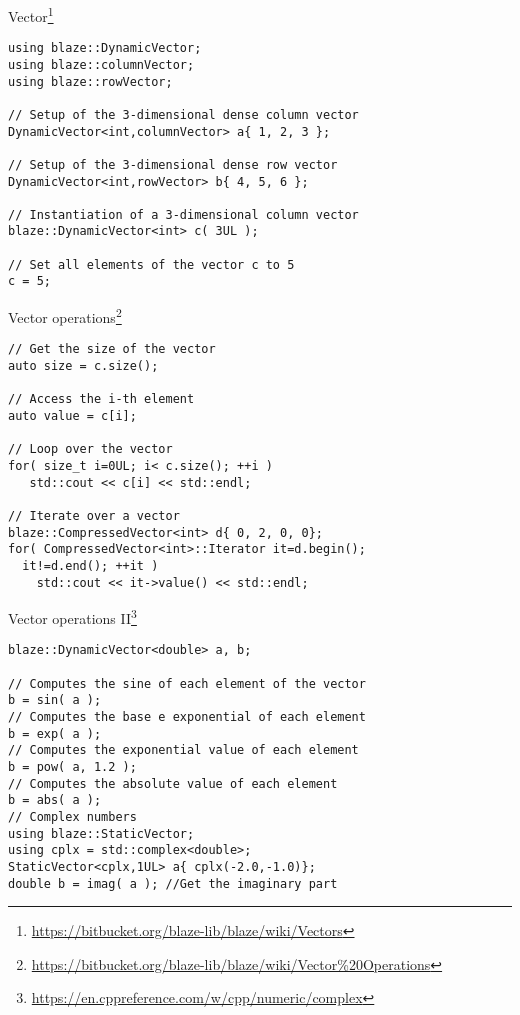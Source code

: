 \documentclass[\classoption]{beamer}
\begin{document}
\begin{frame}[fragile]{Vector\footnote{\tiny\url{https://bitbucket.org/blaze-lib/blaze/wiki/Vectors}}}
\begin{lstlisting}
using blaze::DynamicVector;
using blaze::columnVector;
using blaze::rowVector;

// Setup of the 3-dimensional dense column vector
DynamicVector<int,columnVector> a{ 1, 2, 3 };

// Setup of the 3-dimensional dense row vector
DynamicVector<int,rowVector> b{ 4, 5, 6 };

// Instantiation of a 3-dimensional column vector
blaze::DynamicVector<int> c( 3UL );

// Set all elements of the vector c to 5
c = 5;
\end{lstlisting}
\end{frame}

\begin{frame}[fragile]{Vector operations\footnote{\tiny\url{https://bitbucket.org/blaze-lib/blaze/wiki/Vector\%20Operations}}}
\begin{lstlisting}
// Get the size of the vector
auto size = c.size();

// Access the i-th element
auto value = c[i];

// Loop over the vector
for( size_t i=0UL; i< c.size(); ++i )
   std::cout << c[i] << std::endl;
   
// Iterate over a vector
blaze::CompressedVector<int> d{ 0, 2, 0, 0};
for( CompressedVector<int>::Iterator it=d.begin(); 
  it!=d.end(); ++it ) 
    std::cout << it->value() << std::endl;

\end{lstlisting}
\end{frame}

\begin{frame}[fragile]{Vector operations II\footnote{\tiny\url{https://en.cppreference.com/w/cpp/numeric/complex}}}
\begin{lstlisting}
blaze::DynamicVector<double> a, b;

// Computes the sine of each element of the vector
b = sin( a );  
// Computes the base e exponential of each element
b = exp( a ); 
// Computes the exponential value of each element
b = pow( a, 1.2 );   
// Computes the absolute value of each element
b = abs( a ); 
// Complex numbers
using blaze::StaticVector;
using cplx = std::complex<double>;
StaticVector<cplx,1UL> a{ cplx(-2.0,-1.0)};
double b = imag( a ); //Get the imaginary part 
\end{lstlisting}
\end{frame}
\end{document}
